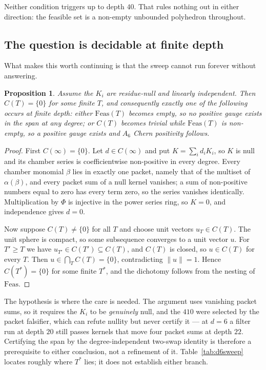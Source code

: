 \documentclass[11pt,a4paper]{article}
\theoremstyle{plain}
\newtheorem{proposition}{Proposition}
\theoremstyle{definition}
\theoremstyle{remark}
\begin{document}
Neither condition triggers up to depth $40$. That rules nothing out in either direction: the
feasible set is a non-empty unbounded polyhedron throughout.

\subsection{The question is decidable at finite depth}

What makes this worth continuing is that the sweep cannot run forever without answering.

\begin{proposition}
Assume the $K_i$ are residue-null and linearly independent. Then $C(T) = \{0\}$ for some finite
$T$, and consequently exactly one of the following occurs at finite depth: either
$\mathrm{Feas}(T)$ becomes empty, so no positive gauge exists in the span at any degree; or
$C(T)$ becomes trivial while $\mathrm{Feas}(T)$ is non-empty, so a positive gauge exists and
$A_6$ Chern positivity follows.
\end{proposition}

\begin{proof}
First $C(\infty) = \{0\}$. Let $d \in C(\infty)$ and put $K = \sum_i d_i K_i$, so $K$ is null and
its chamber series is coefficientwise non-positive in every degree. Every chamber monomial
$\beta$ lies in exactly one packet, namely that of the multiset of $\alpha(\beta)$, and every
packet sum of a null kernel vanishes; a sum of non-positive numbers equal to zero has every term
zero, so the series vanishes identically. Multiplication by $\Phi$ is injective in the power
series ring, so $K = 0$, and independence gives $d = 0$.

Now suppose $C(T) \ne \{0\}$ for all $T$ and choose unit vectors $u_T \in C(T)$. The unit sphere
is compact, so some subsequence converges to a unit vector $u$. For $T' \ge T$ we have
$u_{T'} \in C(T') \subseteq C(T)$, and $C(T)$ is closed, so $u \in C(T)$ for every $T$. Then
$u \in \bigcap_T C(T) = \{0\}$, contradicting $\|u\| = 1$. Hence $C(T^*) = \{0\}$ for some finite
$T^*$, and the dichotomy follows from the nesting of $\mathrm{Feas}$.
\end{proof}

The hypothesis is where the care is needed. The argument uses vanishing packet sums, so it
requires the $K_i$ to be \emph{genuinely} null, and the $410$ were selected by the packet
falsifier, which can refute nullity but never certify it --- at $d = 6$ a filter run at depth
$20$ still passes kernels that move four packet sums at depth $22$. Certifying the span by the
degree-independent two-swap identity is therefore a prerequisite to either conclusion, not a
refinement of it. Table~\ref{tab:d6sweep} locates roughly where $T^*$ lies; it does not
establish either branch.
\end{document}
